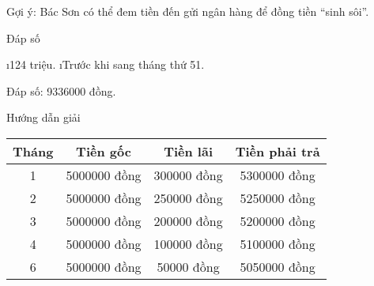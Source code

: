 \begin{Answer}{1}
		Gợi ý: Bác Sơn có thể đem tiền đến gửi ngân hàng để đồng tiền “sinh sôi”.
	
\end{Answer}
\begin{Answer}{2}
		Đáp số
		\begin{enumerate}[a),leftmargin=*]
			\i 124 triệu.
			\i Trước khi sang tháng thứ 51.
		\end{enumerate}
	
\end{Answer}
\begin{Answer}{3}
		Đáp số: 9336000 đồng.
	
\end{Answer}
\begin{Answer}{4}
		Hướng dẫn giải
		\begin{center}
			\begin{tabular}{|c|c|c|c|}
			\hline
			Tháng&Tiền gốc	&Tiền lãi&	Tiền phải trả\\
			\hline
			1&	5000000 đồng&	300000 đồng&	5300000 đồng\\
			\hline
			2&	5000000 đồng&	250000 đồng&	5250000 đồng\\
			\hline
			3&	5000000 đồng&	200000 đồng&	5200000 đồng\\
			\hline
			4&	5000000 đồng&	100000 đồng&	5100000 đồng\\
			\hline
			6&	5000000 đồng&	50000 đồng&	5050000 đồng\\
			\hline
		\end{tabular}
		\end{center}
	
\end{Answer}
